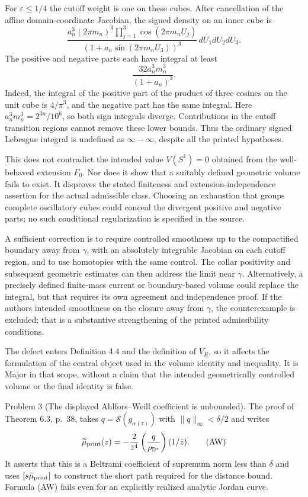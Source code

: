 \documentclass[10pt]{article}
\begin{document}
For \(\varepsilon\leq1/4\) the cutoff weight is one on these cubes. After cancellation of the affine domain-coordinate Jacobian, the signed density on an inner cube is \[\frac{a_n^3(2\pi m_n)^3
       \prod_{j=1}^3\cos(2\pi m_nU_j)}
      {(1+a_n\sin(2\pi m_nU_3))^3}\,dU_1dU_2dU_3 .\] The positive and negative parts each have integral at least \[\frac{32a_n^3m_n^3}{(1+a_n)^3}.\] Indeed, the integral of the positive part of the product of three cosines on the unit cube is \(4/\pi^3\), and the negative part has the same integral. Here \(a_n^3m_n^3=2^{3n}/10^6\), so both sign integrals diverge. Contributions in the cutoff transition regions cannot remove these lower bounds. Thus the ordinary signed Lebesgue integral is undefined as \(\infty-\infty\), despite all the printed hypotheses.\par
This does not contradict the intended value \(V(S^1)=0\) obtained from the well-behaved extension \(F_0\). Nor does it show that a suitably defined geometric volume fails to exist. It disproves the stated finiteness and extension-independence assertion for the actual admissible class. Choosing an exhaustion that groups complete oscillatory cubes could conceal the divergent positive and negative parts; no such conditional regularization is specified in the source.\par
A sufficient correction is to require controlled smoothness up to the compactified boundary away from \(\gamma\), with an absolutely integrable Jacobian on each cutoff region, and to use homotopies with the same control. The collar positivity and subsequent geometric estimates can then address the limit near \(\gamma\). Alternatively, a precisely defined finite-mass current or boundary-based volume could replace the integral, but that requires its own agreement and independence proof. If the authors intended smoothness on the closure away from \(\gamma\), the counterexample is excluded; that is a substantive strengthening of the printed admissibility conditions.\par
The defect enters Definition 4.4 and the definition of \(V_R\), so it affects the formulation of the central object used in the volume identity and inequality. It is Major in that scope, without a claim that the intended geometrically controlled volume or the final identity is false.\par
Problem 3 (The displayed Ahlfors–Weill coefficient is unbounded).  The proof of Theorem 6.3, p. 38, takes \(q=\mathcal S(g_{\alpha(\tau)})\) with \(\|q\|_\infty<\delta/2\) and writes \[\widetilde\mu_{\rm print}(z)
 =-\frac{2}{\bar z^4}
       \left(\frac{q}{\rho_{\mathbb D^*}}\right)(1/\bar z).
 \tag{AW}\] It asserts that this is a Beltrami coefficient of supremum norm less than \(\delta\) and uses \([s\widetilde\mu_{\rm print}]\) to construct the short path required for the distance bound. Formula (AW) fails even for an explicitly realized analytic Jordan curve.\par
\end{document}
